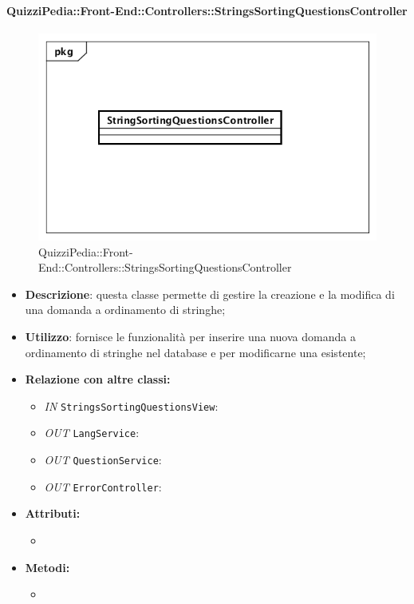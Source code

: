 \paragraph{QuizziPedia::Front-End::Controllers::StringsSortingQuestionsController}
\begin{figure}
	\centering
	\includegraphics[scale=0.45]{UML/Classi/Front-End/QuizziPedia_Front-end_Controller_StringSortingQuestionsController.png}
	\caption{QuizziPedia::Front-End::Controllers::StringsSortingQuestionsController}
\end{figure}
\begin{itemize}
	\item \textbf{Descrizione}: questa classe permette di gestire la creazione e la modifica di una domanda a ordinamento di stringhe;
	\item \textbf{Utilizzo}: fornisce le funzionalità per inserire una nuova domanda a ordinamento di stringhe nel database e per modificarne una esistente;
	\item \textbf{Relazione con altre classi:}
	\begin{itemize}
		\item \textit{IN} \texttt{StringsSortingQuestionsView}:  
		\item \textit{OUT} \texttt{LangService}: 
		\item \textit{OUT} \texttt{QuestionService}:
		\item \textit{OUT} \texttt{ErrorController}: 
	\end{itemize}
	\item \textbf{Attributi:}
	\begin{itemize}
		\item 
	\end{itemize}
	\item \textbf{Metodi:}
	\begin{itemize}
		\item 
	\end{itemize}
\end{itemize}

